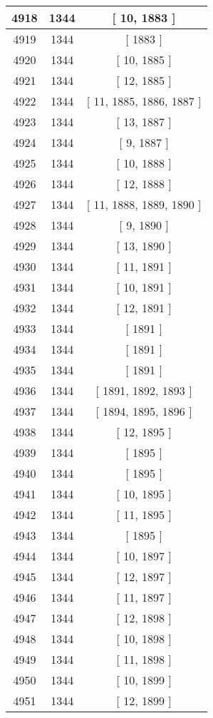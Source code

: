 \begin{center}
\begin{longtable}[H]{|| c c c ||}
\hline
4918 & 1344 & [ 10, 1883 ] \\ 
\hline
4919 & 1344 & [ 1883 ] \\ 
\hline
4920 & 1344 & [ 10, 1885 ] \\ 
\hline
4921 & 1344 & [ 12, 1885 ] \\ 
\hline
4922 & 1344 & [ 11, 1885, 1886, 1887 ] \\ 
\hline
4923 & 1344 & [ 13, 1887 ] \\ 
\hline
4924 & 1344 & [ 9, 1887 ] \\ 
\hline
4925 & 1344 & [ 10, 1888 ] \\ 
\hline
4926 & 1344 & [ 12, 1888 ] \\ 
\hline
4927 & 1344 & [ 11, 1888, 1889, 1890 ] \\ 
\hline
4928 & 1344 & [ 9, 1890 ] \\ 
\hline
4929 & 1344 & [ 13, 1890 ] \\ 
\hline
4930 & 1344 & [ 11, 1891 ] \\ 
\hline
4931 & 1344 & [ 10, 1891 ] \\ 
\hline
4932 & 1344 & [ 12, 1891 ] \\ 
\hline
4933 & 1344 & [ 1891 ] \\ 
\hline
4934 & 1344 & [ 1891 ] \\ 
\hline
4935 & 1344 & [ 1891 ] \\ 
\hline
4936 & 1344 & [ 1891, 1892, 1893 ] \\ 
\hline
4937 & 1344 & [ 1894, 1895, 1896 ] \\ 
\hline
4938 & 1344 & [ 12, 1895 ] \\ 
\hline
4939 & 1344 & [ 1895 ] \\ 
\hline
4940 & 1344 & [ 1895 ] \\ 
\hline
4941 & 1344 & [ 10, 1895 ] \\ 
\hline
4942 & 1344 & [ 11, 1895 ] \\ 
\hline
4943 & 1344 & [ 1895 ] \\ 
\hline
4944 & 1344 & [ 10, 1897 ] \\ 
\hline
4945 & 1344 & [ 12, 1897 ] \\ 
\hline
4946 & 1344 & [ 11, 1897 ] \\ 
\hline
4947 & 1344 & [ 12, 1898 ] \\ 
\hline
4948 & 1344 & [ 10, 1898 ] \\ 
\hline
4949 & 1344 & [ 11, 1898 ] \\ 
\hline
4950 & 1344 & [ 10, 1899 ] \\ 
\hline
4951 & 1344 & [ 12, 1899 ] \\ 

\end{longtable}
\end{center}
